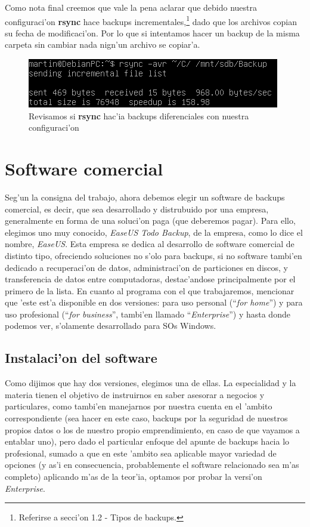 \documentclass[11pt]{article}
\newcommand{\rsync}[0]{\textbf{rsync}}
\begin{document}
		Como nota final creemos que vale la pena aclarar que debido nuestra configuraci'on \rsync{} hace backups incrementales,\footnote{Referirse a secci'on 1.2 - Tipos de backups.} dado que los archivos copian su fecha de modificaci'on. Por lo que si intentamos hacer un backup de la misma carpeta sin cambiar nada nign'un archivo se copiar'a.

		\begin{figure}[H]
			\centering
			\includegraphics[scale=0.7]{Images/rsync/rsync_backup_incremental.PNG}
			\caption{Revisamos si \rsync{} hac'ia backups diferenciales con nuestra configuraci'on}
			\label{fig:rsync_backup_incremental}
		\end{figure}

	\section{Software comercial}
	Seg'un la consigna del trabajo, ahora debemos elegir un software de backups comercial, es decir, que sea desarrollado y distrubuido por una empresa, generalmente en forma de una soluci'on paga (que deberemos pagar). Para ello, elegimos uno muy conocido, \textit{EaseUS Todo Backup}, de la empresa, como lo dice el nombre, \textit{EaseUS}. Esta empresa se dedica al desarrollo de software comercial de distinto tipo, ofreciendo soluciones no s'olo para backups, si no software tambi'en dedicado a recuperaci'on de datos, administraci'on de particiones en discos, y transferencia de datos entre computadoras, destac'andose principalmente por el primero de la lista. En cuanto al programa con el que trabajaremos, mencionar que 'este est'a disponible en dos versiones: para uso personal (``\textit{for home}'') y para uso profesional (``\textit{for business}'', tambi'en llamado ``\textit{Enterprise}'') y hasta donde podemos ver, s'olamente desarrollado para SOs Windows.
	
	\subsection{Instalaci'on del software}
	Como dijimos que hay dos versiones, elegimos una de ellas. La especialidad y la materia tienen el objetivo de instruirnos en saber asesorar a negocios y particulares, como tambi'en manejarnos por nuestra cuenta en el 'ambito correspondiente (sea hacer en este caso, backups por la seguridad de nuestros propios datos o los de nuestro propio emprendimiento, en caso de que vayamos a entablar uno), pero dado el particular enfoque del apunte de backups hacia lo profesional, sumado a que en este 'ambito sea aplicable mayor variedad de opciones (y as'i en consecuencia, probablemente el software relacionado sea m'as completo) aplicando m'as de la teor'ia, optamos por probar la versi'on \textit{Enterprise}.
	
\end{document}
